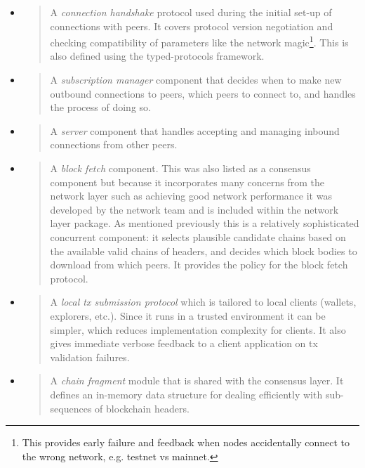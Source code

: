 \documentclass[11pt,a4paper]{article}
\begin{document}
\begin{itemize}
\item
  \begin{quote}
  A \emph{connection handshake} protocol used during the initial set-up
  of connections with peers. It covers protocol version negotiation and
  checking compatibility of parameters like the network magic\footnote{This
    provides early failure and feedback when nodes accidentally connect
    to the wrong network, e.g. testnet vs mainnet.}. This is also
  defined using the typed-protocols framework.
  \end{quote}
\item
  \begin{quote}
  A \emph{subscription manager} component that decides when to make new
  outbound connections to peers, which peers to connect to, and handles
  the process of doing so.
  \end{quote}
\item
  \begin{quote}
  A \emph{server} component that handles accepting and managing inbound
  connections from other peers.
  \end{quote}
\item
  \begin{quote}
  A \emph{block fetch} component. This was also listed as a consensus
  component but because it incorporates many concerns from the network
  layer such as achieving good network performance it was developed by
  the network team and is included within the network layer package. As
  mentioned previously this is a relatively sophisticated concurrent
  component: it selects plausible candidate chains based on the
  available valid chains of headers, and decides which block bodies to
  download from which peers. It provides the policy for the block fetch
  protocol.
  \end{quote}
\item
  \begin{quote}
  A \emph{local tx submission protocol} which is tailored to local
  clients (wallets, explorers, etc.). Since it runs in a trusted
  environment it can be simpler, which reduces implementation complexity
  for clients. It also gives immediate verbose feedback to a client
  application on tx validation failures.
  \end{quote}
\item
  \begin{quote}
  A \emph{chain fragment} module that is shared with the consensus
  layer. It defines an in-memory data structure for dealing efficiently
  with sub-sequences of blockchain headers.
  \end{quote}
\end{itemize}
\end{document}
